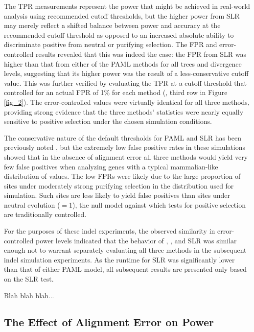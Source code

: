 The TPR measurements represent the power that might be achieved in
real-world analysis using recommended cutoff thresholds, but the
higher power from SLR may merely reflect a shifted balance between
power and accuracy at the recommended cutoff threshold as opposed to
an increased absolute ability to discriminate positive from neutral or
purifying selection. The FPR and error-controlled \tpr results
revealed that this was indeed the case: the FPR from SLR was higher
than that from either of the PAML methods for all trees and divergence
levels, suggesting that its higher power was the result of a
less-conservative cutoff value. This was further verified by
evaluating the TPR at a cutoff threshold that controlled for an actual
FPR of 1\% for each method (\tpr{}, third row in Figure
\ref{fig_2}). The error-controlled \tpr values were virtually
identical for all three methods, providing strong evidence that the
three methods' \sw statistics were nearly equally sensitive to
positive selection under the chosen simulation conditions.

The conservative nature of the default thresholds for PAML and SLR has
been previously noted
\citep{Anisimova2002,Yang2005Bayes,Massingham2005}, but the extremely
low false positive rates in these simulations showed that in the
absence of alignment error all three methods would yield very few
false positives when analyzing genes with a typical mammalian-like
distribution of \omg values. The low FPRs were likely due to the large
proportion of sites under moderately strong purifying selection in the
\omg distribution used for simulation. Such sites are less likely to
yield false positives than sites under neutral evolution (\omg$=$1), the
null model against which tests for positive selection are
traditionally controlled.

For the purposes of these indel experiments, the observed similarity in
error-controlled power levels indicated that the behavior of \mtwo,
\meight, and SLR was similar enough not to warrant separately
evaluating all three methods in the subsequent indel simulation
experiments. As the runtime for SLR was significantly lower than that
of either PAML model, all subsequent results are presented only based
on the SLR test.

Blah blah blah...

\subsection{The Effect of Alignment Error on \Sw Power}

